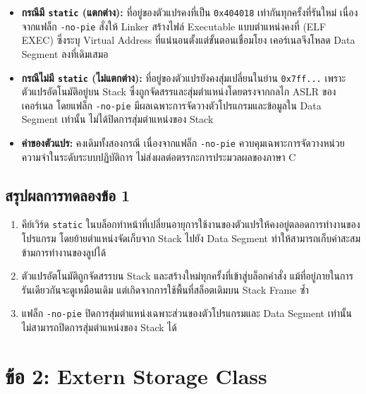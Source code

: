 \documentclass[a4paper,11pt]{article}
\newcommand{\code}[1]{\texttt{#1}}
\begin{document}
\begin{itemize}[leftmargin=*]
  \item \textbf{กรณีมี \code{static} (แตกต่าง):} ที่อยู่ของตัวแปรคงที่เป็น \code{0x404018} เท่ากันทุกครั้งที่รันใหม่ เนื่องจากแฟล็ก \code{-no-pie} สั่งให้ Linker สร้างไฟล์ Executable แบบตำแหน่งคงที่ (ELF EXEC) ซึ่งระบุ Virtual Address ที่แน่นอนตั้งแต่ขั้นตอนเชื่อมโยง เคอร์เนลจึงโหลด Data Segment ลงที่เดิมเสมอ
  \item \textbf{กรณีไม่มี \code{static} (ไม่แตกต่าง):} ที่อยู่ของตัวแปรยังคงสุ่มเปลี่ยนในย่าน \code{0x7ff...} เพราะตัวแปรอัตโนมัติอยู่บน Stack ซึ่งถูกจัดสรรและสุ่มตำแหน่งโดยตรงจากกลไก ASLR ของเคอร์เนล โดยแฟล็ก \code{-no-pie} มีผลเฉพาะการจัดวางตัวโปรแกรมและข้อมูลใน Data Segment เท่านั้น ไม่ได้ปิดการสุ่มตำแหน่งของ Stack
  \item \textbf{ค่าของตัวแปร:} คงเดิมทั้งสองกรณี เนื่องจากแฟล็ก \code{-no-pie} ควบคุมเฉพาะการจัดวางหน่วยความจำในระดับระบบปฏิบัติการ ไม่ส่งผลต่อตรรกะการประมวลผลของภาษา C
\end{itemize}

\subsection{สรุปผลการทดลองข้อ 1}

\begin{enumerate}[leftmargin=*]
  \item คีย์เวิร์ด \code{static} ในบล็อกทำหน้าที่เปลี่ยนอายุการใช้งานของตัวแปรให้คงอยู่ตลอดการทำงานของโปรแกรม โดยย้ายตำแหน่งจัดเก็บจาก Stack ไปยัง Data Segment ทำให้สามารถเก็บค่าสะสมข้ามการทำงานของลูปได้
  \item ตัวแปรอัตโนมัติถูกจัดสรรบน Stack และสร้างใหม่ทุกครั้งที่เข้าสู่บล็อกคำสั่ง แม้ที่อยู่ภายในการรันเดียวกันจะดูเหมือนเดิม แต่เกิดจากการใช้พื้นที่สล็อตเดิมบน Stack Frame ซ้ำ
  \item แฟล็ก \code{-no-pie} ปิดการสุ่มตำแหน่งเฉพาะส่วนของตัวโปรแกรมและ Data Segment เท่านั้น ไม่สามารถปิดการสุ่มตำแหน่งของ Stack ได้
\end{enumerate}

\section{ข้อ 2: Extern Storage Class}
\end{document}
